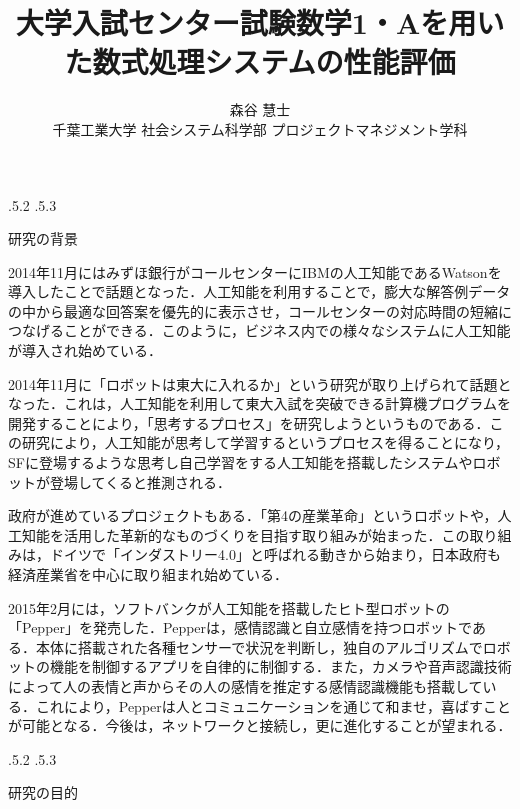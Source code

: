 \documentclass[uplatex,twocolumn]{jsarticle}
\title{\vspace{-14mm}大学入試センター試験数学1・Aを用いた数式処理システムの性能評価 \footnotemark[0]}
\author{森谷 慧士 \footnotemark[2] \\ 千葉工業大学 社会システム科学部 プロジェクトマネジメント学科\footnotemark[2]}
\date{}%
\makeatletter
\renewcommand{\section}{%
    \if@slide\clearpage\fi
    \@startsection{section}{1}{\z@}%
    {\Cvs \@plus.5\Cdp \@minus.2\Cdp}%
    {.5\Cvs \@plus.3\Cdp}%
    {\normalfont\raggedright}}
\makeatother
\begin{document}
\twocolumn[
	\maketitle
]

\begingroup
\def\thefootnote{\fnsymbol{footnote}}
\endgroup




\section{研究の背景}

2014年11月にはみずほ銀行がコールセンターにIBMの人工知能であるWatsonを導入したことで話題となった\cite{mizuho2014}．人工知能を利用することで，膨大な解答例データの中から最適な回答案を優先的に表示させ，コールセンターの対応時間の短縮につなげることができる．このように，ビジネス内での様々なシステムに人工知能が導入され始めている．
 
2014年11月に「ロボットは東大に入れるか」という研究が取り上げられて話題となった\cite{tourobo2014}．これは，人工知能を利用して東大入試を突破できる計算機プログラムを開発することにより，「思考するプロセス」を研究しようというものである．この研究により，人工知能が思考して学習するというプロセスを得ることになり，SFに登場するような思考し自己学習をする人工知能を搭載したシステムやロボットが登場してくると推測される．

政府が進めているプロジェクトもある．「第4の産業革命」というロボットや，人工知能を活用した革新的なものづくりを目指す取り組みが始まった．この取り組みは，ドイツで「インダストリー4.0」と呼ばれる動きから始まり，日本政府も経済産業省を中心に取り組まれ始めている\cite{sangyou2014}．

2015年2月には，ソフトバンクが人工知能を搭載したヒト型ロボットの「Pepper」を発売した．Pepperは，感情認識と自立感情を持つロボットである．本体に搭載された各種センサーで状況を判断し，独自のアルゴリズムでロボットの機能を制御するアプリを自律的に制御する．また，カメラや音声認識技術によって人の表情と声からその人の感情を推定する感情認識機能も搭載している．これにより，Pepperは人とコミュニケーションを通じて和ませ，喜ばすことが可能となる．今後は，ネットワークと接続し，更に進化することが望まれる\cite{softbank}．





\section{研究の目的}
\end{document}
